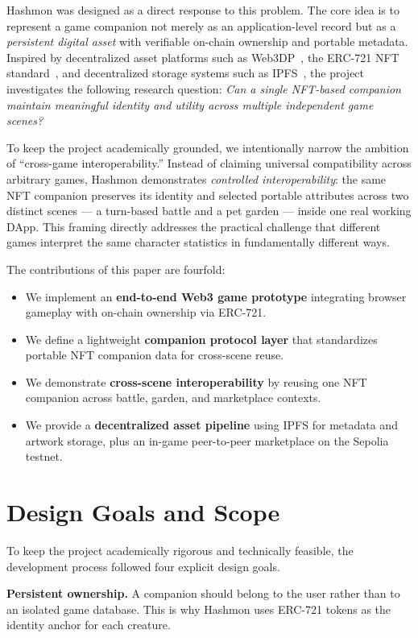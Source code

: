 \documentclass[sigconf]{acmart}
\begin{document}
Hashmon was designed as a direct response to this problem. The core idea is to represent a game companion not merely as an application-level record but as a \emph{persistent digital asset} with verifiable on-chain ownership and portable metadata. Inspired by decentralized asset platforms such as Web3DP~\cite{web3dp}, the ERC-721 NFT standard~\cite{erc721}, and decentralized storage systems such as IPFS~\cite{benet2014ipfs}, the project investigates the following research question: \emph{Can a single NFT-based companion maintain meaningful identity and utility across multiple independent game scenes?}

To keep the project academically grounded, we intentionally narrow the ambition of ``cross-game interoperability.'' Instead of claiming universal compatibility across arbitrary games, Hashmon demonstrates \emph{controlled interoperability}: the same NFT companion preserves its identity and selected portable attributes across two distinct scenes --- a turn-based battle and a pet garden --- inside one real working DApp. This framing directly addresses the practical challenge that different games interpret the same character statistics in fundamentally different ways.

The contributions of this paper are fourfold:
\begin{itemize}[leftmargin=1.5em]
    \item We implement an \textbf{end-to-end Web3 game prototype} integrating browser gameplay with on-chain ownership via ERC-721.
    \item We define a lightweight \textbf{companion protocol layer} that standardizes portable NFT companion data for cross-scene reuse.
    \item We demonstrate \textbf{cross-scene interoperability} by reusing one NFT companion across battle, garden, and marketplace contexts.
    \item We provide a \textbf{decentralized asset pipeline} using IPFS for metadata and artwork storage, plus an in-game peer-to-peer marketplace on the Sepolia testnet.
\end{itemize}

\section{Design Goals and Scope}
To keep the project academically rigorous and technically feasible, the development process followed four explicit design goals.

\textbf{Persistent ownership.} A companion should belong to the user rather than to an isolated game database. This is why Hashmon uses ERC-721 tokens as the identity anchor for each creature.
\end{document}
